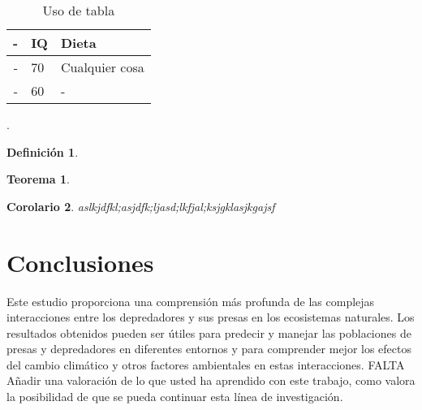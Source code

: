 \documentclass{wscpaperproc}
\theoremstyle{wsc}
\newtheorem{theorem}{Teorema}
\newtheorem{corollary}[theorem]{Corolario}
\newtheorem{definition}{Definici\'on}
\begin{document}
\begin{table}[htb]
	\centering
	\caption{Uso de tabla\label{tab: first}}
	\begin{tabular}{rll}
		\hline
		- & IQ & Dieta          \\ \hline
		- & 70 & Cualquier cosa \\
		- & 60 & -              \\
		\hline
	\end{tabular}
\end{table}



.
\begin{definition}

\end{definition}

\begin{theorem}

\end{theorem}

\begin{corollary}
	aslkjdfkl;asjdfk;ljasd;lkfjal;ksjgklasjkgajsf
\end{corollary}


\section*{Conclusiones}
Este estudio proporciona una comprensi\'on más profunda de las complejas interacciones entre los depredadores y sus presas en
los ecosistemas naturales. Los resultados obtenidos pueden ser \'utiles para predecir y manejar las poblaciones de presas y
depredadores en diferentes entornos y para comprender mejor los efectos del cambio clim\'atico y otros factores ambientales
en estas interacciones. FALTA Añadir una valoración de lo que usted ha aprendido con este trabajo, como valora la
posibilidad de que se pueda continuar esta línea de investigación.
\end{document}
